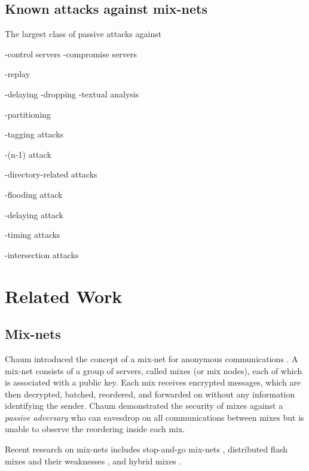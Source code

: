 \documentclass[11pt]{IEEEtran}
\begin{document}
\subsection{Known attacks against mix-nets}

The largest class of passive attacks against 

-control servers
-compromise servers

-replay

-delaying
-dropping
-textual analysis

-partitioning

-tagging attacks

-(n-1) attack

-directory-related attacks

-flooding attack

-delaying attack

-timing attacks

-intersection attacks


\section{Related Work}
\label{sec:related}

\subsection{Mix-nets}

Chaum introduced the concept of a mix-net for anonymous communications
\cite{chaum-mix}. A mix-net consists of a group of servers, called
mixes (or mix nodes), each of which is associated with a public
key. Each mix receives encrypted messages, which are then decrypted,
batched, reordered, and forwarded on without any information
identifying the sender. Chaum demonstrated the security of mixes
against a \emph{passive adversary} who can eavesdrop on all
communications between mixes but is unable to observe the reordering
inside each mix.

Recent research on mix-nets includes stop-and-go mix-nets
\cite{kesdogan}, distributed flash mixes \cite{flash-mix} and their
weaknesses \cite{desmedt}\cite{mitkuro}, and hybrid mixes \cite{hybrid-mix}.
\end{document}
